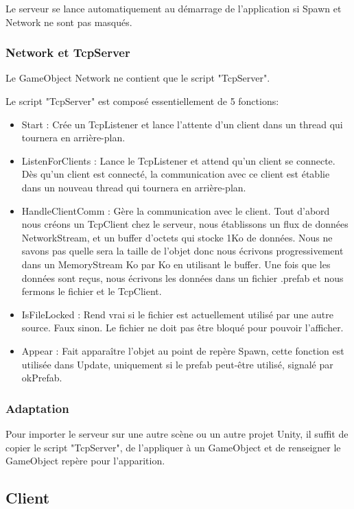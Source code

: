 \documentclass[a4paper,11pt]{article}
\begin{document}
		Le serveur se lance automatiquement au démarrage de l'application si Spawn et Network ne sont pas masqués.
		\subsubsection{Network et TcpServer}
			Le GameObject Network ne contient que le script "TcpServer".
			
			Le script "TcpServer" est composé essentiellement de 5 fonctions:
			\begin{itemize}
				\item Start : Crée un TcpListener et lance l'attente d'un client dans un thread qui tournera en arrière-plan.
				
				\item ListenForClients : Lance le TcpListener et attend qu'un client se connecte. Dès qu'un client est connecté, la communication avec ce client est établie dans un nouveau thread qui tournera en arrière-plan.
				
				\item HandleClientComm : Gère la communication avec le client. Tout d'abord nous créons un TcpClient chez le serveur, nous établissons un flux de données NetworkStream, et un buffer d'octets qui stocke 1Ko de données. Nous ne savons pas quelle sera la taille de l'objet donc nous écrivons progressivement dans un MemoryStream Ko par Ko en utilisant le buffer.
				Une fois que les données sont reçus, nous écrivons les données dans un fichier .prefab et nous fermons le fichier et le TcpClient.
				
				\item IsFileLocked : Rend vrai si le fichier est actuellement utilisé par une autre source. Faux sinon. Le fichier ne doit pas être bloqué pour pouvoir l'afficher.
				
				\item Appear : Fait apparaître l'objet au point de repère Spawn, cette fonction est utilisée dans Update, uniquement si le prefab peut-être utilisé, signalé par okPrefab.
			\end{itemize}
			
		\subsubsection{Adaptation}
			Pour importer le serveur sur une autre scène ou un autre projet Unity, il suffit de copier le script "TcpServer", de l'appliquer à un GameObject et de renseigner le GameObject repère pour l'apparition.
		
	\subsection{Client}
\end{document}
